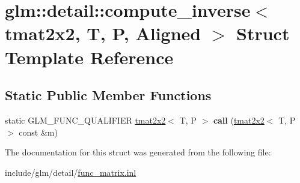 \hypertarget{structglm_1_1detail_1_1compute__inverse_3_01tmat2x2_00_01T_00_01P_00_01Aligned_01_4}{}\section{glm\+:\+:detail\+:\+:compute\+\_\+inverse$<$ tmat2x2, T, P, Aligned $>$ Struct Template Reference}
\label{structglm_1_1detail_1_1compute__inverse_3_01tmat2x2_00_01T_00_01P_00_01Aligned_01_4}
\subsection*{Static Public Member Functions}
\begin{DoxyCompactItemize}
\item 
\mbox{\label{structglm_1_1detail_1_1compute__inverse_3_01tmat2x2_00_01T_00_01P_00_01Aligned_01_4_a936dd8efa75bed24911e846504e3dbef}} 
static G\+L\+M\+\_\+\+F\+U\+N\+C\+\_\+\+Q\+U\+A\+L\+I\+F\+I\+ER \hyperlink{structglm_1_1tmat2x2}{tmat2x2}$<$ T, P $>$ {\bfseries call} (\hyperlink{structglm_1_1tmat2x2}{tmat2x2}$<$ T, P $>$ const \&m)
\end{DoxyCompactItemize}


The documentation for this struct was generated from the following file\+:\begin{DoxyCompactItemize}
\item 
include/glm/detail/\hyperlink{func__matrix_8inl}{func\+\_\+matrix.\+inl}\end{DoxyCompactItemize}
